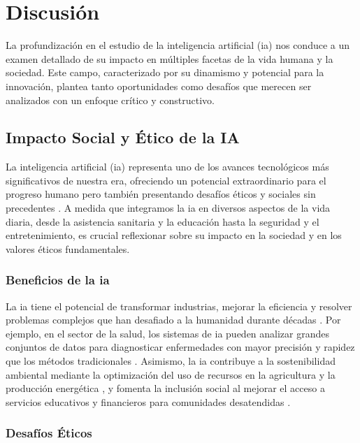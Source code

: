 \chapter{Discusión}

La profundización en el estudio de la inteligencia artificial (\acrshort{ia}) nos conduce a un examen detallado de su impacto en múltiples facetas de la vida humana y la sociedad. Este campo, caracterizado por su dinamismo y potencial para la innovación, plantea tanto oportunidades como desafíos que merecen ser analizados con un enfoque crítico y constructivo.

\section{Impacto Social y Ético de la IA}

La inteligencia artificial (\acrshort{ia}) representa uno de los avances tecnológicos más significativos de nuestra era, ofreciendo un potencial extraordinario para el progreso humano pero también presentando desafíos éticos y sociales sin precedentes \cite{Smith2021}. A medida que integramos la \acrshort{ia} en diversos aspectos de la vida diaria, desde la asistencia sanitaria y la educación hasta la seguridad y el entretenimiento, es crucial reflexionar sobre su impacto en la sociedad y en los valores éticos fundamentales.

\subsection{Beneficios de la \acrshort{ia}}

La \acrshort{ia} tiene el potencial de transformar industrias, mejorar la eficiencia y resolver problemas complejos que han desafiado a la humanidad durante décadas \cite{Johnson2019}. Por ejemplo, en el sector de la salud, los sistemas de \acrshort{ia} pueden analizar grandes conjuntos de datos para diagnosticar enfermedades con mayor precisión y rapidez que los métodos tradicionales \cite{Garcia2020}. Asimismo, la \acrshort{ia} contribuye a la sostenibilidad ambiental mediante la optimización del uso de recursos en la agricultura y la producción energética \cite{Lee2018}, y fomenta la inclusión social al mejorar el acceso a servicios educativos y financieros para comunidades desatendidas \cite{Kumar2021}.

\subsection{Desafíos Éticos}

